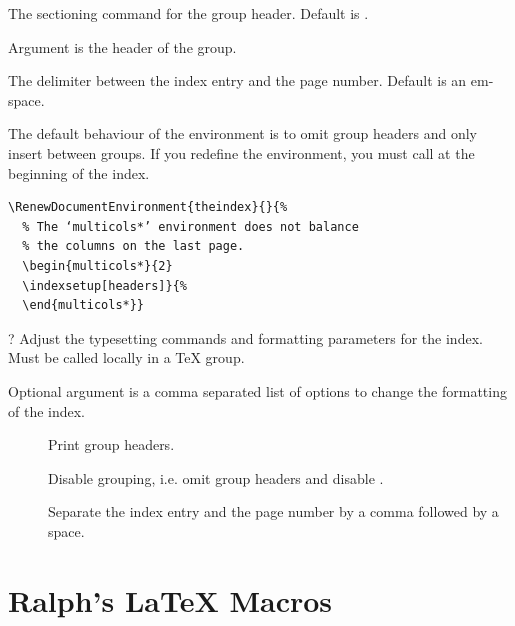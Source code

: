 \documentclass{scrartcl}
\begin{document}
\begin{definition}
 
The sectioning command for the group header.
Default is \symb{\minisec}.

Argument  is the header of the group.
\end{definition}

\begin{definition}
The delimiter between the index entry and the page number.
Default is an em-space.
\end{definition}

The default behaviour of the  environment is to omit
group headers and only insert  between groups.  If
you redefine the  environment, you must call
 at the beginning of the index.
\begin{display}
\begin{verbatim}
\RenewDocumentEnvironment{theindex}{}{%
  % The ‘multicols*’ environment does not balance
  % the columns on the last page.
  \begin{multicols*}{2}
  \indexsetup[headers]}{%
  \end{multicols*}}
\end{verbatim}
\end{display}

\begin{definition}
 \kleene?
Adjust the typesetting commands and formatting parameters for the
index.  Must be called locally in a \TeX{} group.

Optional argument  is a comma separated list of
options to change the formatting of the index.
\begin{description}
\item[]
Print group headers.

\item[]
Disable grouping, i.e. omit group headers and disable
\symb{\indexspace}.

\item[]
Separate the index entry and the page number by a comma followed
by a space.
\end{description}
\end{definition}


\section{Ralph's \LaTeX{} Macros}
\end{document}
